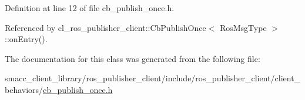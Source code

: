 Definition at line 12 of file cb\+\_\+publish\+\_\+once.\+h.



Referenced by cl\+\_\+ros\+\_\+publisher\+\_\+client\+::\+Cb\+Publish\+Once$<$ Ros\+Msg\+Type $>$\+::on\+Entry().



The documentation for this class was generated from the following file\+:\begin{DoxyCompactItemize}
\item 
smacc\+\_\+client\+\_\+library/ros\+\_\+publisher\+\_\+client/include/ros\+\_\+publisher\+\_\+client/client\+\_\+behaviors/\hyperlink{cb__publish__once_8h}{cb\+\_\+publish\+\_\+once.\+h}\end{DoxyCompactItemize}

